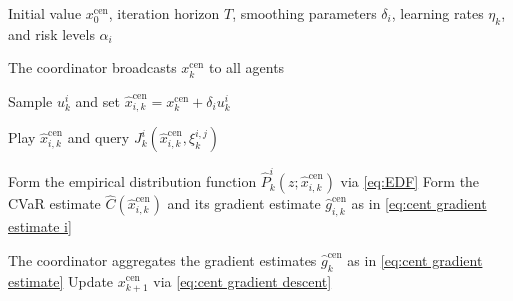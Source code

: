\documentclass[twocolumn]{autart}    %
\newcommand{\1}{\mathbf{1}}
\begin{document}
\begin{algorithm}[t]
\caption{Zeroth-order centralized risk-averse learning}
\label{alg:centralize}
\begin{algorithmic}[1]
    \Require Initial value $x_0^{\mathrm{cen}}$, iteration horizon $T$,
    smoothing parameters $\delta_i$, learning rates $\eta_k$, and risk
    levels $\alpha_i$

        \State The coordinator broadcasts $x_k^{\mathrm{cen}}$ to all agents

            \State Sample $u_k^i$ and set
            $\hat{x}_{i,k}^{\mathrm{cen}}
            = x_k^{\mathrm{cen}}+\delta_i u_k^i$

                \State Play $\hat{x}_{i,k}^{\mathrm{cen}}$ and query
                $J_k^i(\hat{x}_{i,k}^{\mathrm{cen}},\xi_k^{i,j})$
            \EndFor

            \State Form the empirical distribution function
            $\hat{P}_k^i(z;\hat{x}_{i,k}^{\mathrm{cen}})$
            via \eqref{eq:EDF}
            \State Form the CVaR estimate
            $\widehat{C}(\hat{x}_{i,k}^{\mathrm{cen}})$ and its gradient
            estimate $\hat{g}_{i,k}^{\mathrm{cen}}$ as in
            \eqref{eq:cent gradient estimate i}
        \EndFor

        \State The coordinator aggregates the gradient estimates
        $\hat{g}_k^{\mathrm{cen}}$ as in
        \eqref{eq:cent gradient estimate}
        \State Update $x_{k+1}^{\mathrm{cen}}$ via
        \eqref{eq:cent gradient descent}
    \EndFor
\end{algorithmic}
\end{algorithm}
\end{document}
